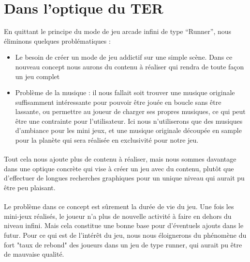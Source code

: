 \documentclass[a4paper,11pt]{article}
\begin{document}
\section{Dans l'optique du TER}
En quittant le principe du mode de jeu arcade infini de type “Runner”, nous éliminons quelques problématiques :
\begin{itemize}
\item Le besoin de créer un mode de jeu addictif sur une simple scène. Dans ce nouveau concept nous aurons du contenu à réaliser qui rendra de toute façon un jeu complet
\item Problème de la musique : il nous fallait soit trouver une musique originale suffisamment intéressante pour pouvoir être jouée en boucle sans être lassante, ou permettre au joueur de charger ses propres musiques, ce qui peut être une contrainte pour l'utilisateur. Ici nous n’utiliserons que des musiques d’ambiance pour les mini jeux, et une musique originale découpée en sample pour la planète qui sera réalisée en exclusivité pour notre jeu.
\end{itemize}

\paragraph{} Tout cela nous ajoute plus de contenu à réaliser, mais nous sommes davantage dans une optique concrète qui vise à créer un jeu avec du contenu, plutôt que d’effectuer de longues recherches graphiques pour un unique niveau qui aurait pu être peu plaisant.

\paragraph{} Le problème dans ce concept est sûrement la durée de vie du jeu. Une fois les mini-jeux réalisés, le joueur n’a plus de nouvelle activité à faire en dehors du niveau infini. Mais cela constitue une bonne base pour d’éventuels ajouts dans le futur. Pour ce qui est de l'intérêt du jeu, nous nous éloignerons du phénomène du fort "taux de rebond" des joueurs dans un jeu de type runner, qui aurait pu être de mauvaise qualité.
\end{document}
